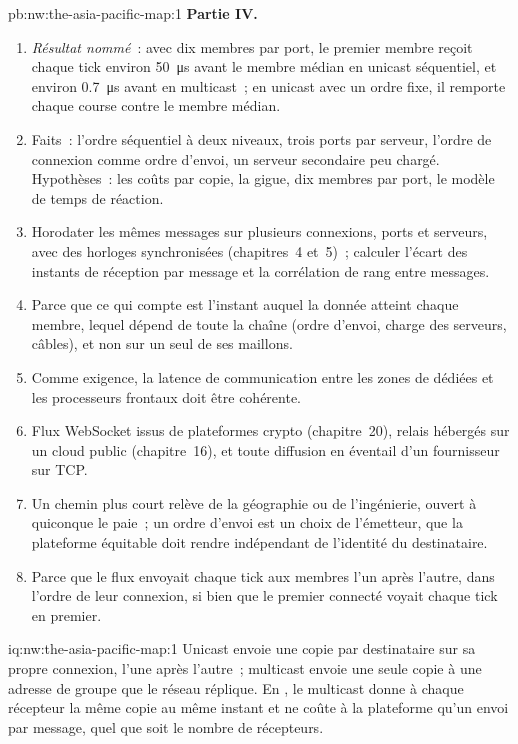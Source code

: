 \begin{solution}{pb:nw:the-asia-pacific-map:1}
\textbf{Partie IV.}
\begin{enumerate}[resume]
\item \emph{Résultat nommé}~: avec dix membres par port, le premier membre reçoit chaque tick environ \qty{50}{\micro\second} avant le membre médian
  en unicast séquentiel, et environ \qty{0.7}{\micro\second} avant en multicast~; en unicast avec un ordre fixe, il remporte chaque course
  contre le membre médian.
\item Faits~: l'ordre séquentiel à deux niveaux, trois ports par serveur, l'ordre de connexion comme ordre d'envoi, un serveur secondaire peu chargé.
  Hypothèses~: les coûts par copie, la gigue, dix membres par port, le modèle de temps de réaction.
\item Horodater les mêmes messages sur plusieurs connexions, ports et serveurs, avec des horloges synchronisées (chapitres~4 et~5)~; calculer l'écart des
  instants de réception par message et la corrélation de rang entre messages.
\item Parce que ce qui compte est l'instant auquel la donnée atteint chaque membre, lequel dépend de toute la chaîne (ordre d'envoi, charge
  des serveurs, câbles), et non sur un seul de ses maillons.
\item Comme exigence, la latence de communication entre les zones de  dédiées et les processeurs frontaux doit être cohérente.
\item Flux WebSocket issus de plateformes crypto (chapitre~20), relais hébergés sur un cloud public (chapitre~16), et toute diffusion en éventail d'un fournisseur sur TCP.
\item Un chemin plus court relève de la géographie ou de l'ingénierie, ouvert à quiconque le paie~; un ordre d'envoi est un choix de l'émetteur,
  que la plateforme équitable doit rendre indépendant de l'identité du destinataire.
\item Parce que le flux envoyait chaque tick aux membres l'un après l'autre, dans l'ordre de leur connexion, si bien que le premier connecté voyait chaque tick
  en premier.
\end{enumerate}
\end{solution}

\begin{solution}{iq:nw:the-asia-pacific-map:1}
Unicast envoie une copie par destinataire sur sa propre connexion, l'une après l'autre~; multicast envoie une seule copie à une adresse de groupe que le réseau
réplique. En , le multicast donne à chaque récepteur la même copie au même instant et ne coûte à la plateforme qu'un envoi par message,
quel que soit le nombre de récepteurs.
\end{solution}


